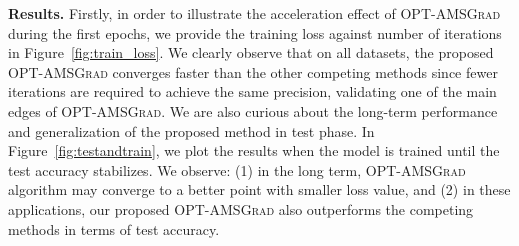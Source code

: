 \documentclass[wcp]{jmlr}
\begin{document}
\textbf{Results.} 
Firstly, in order to illustrate the acceleration effect of \textsc{OPT-AMSGrad} during the first epochs, we provide the training loss against number of iterations in Figure~\ref{fig:train_loss}. 
We clearly observe that on all datasets, the proposed \textsc{OPT-AMSGrad} converges faster than the other competing methods since fewer iterations are required to achieve the same precision, validating one of the main edges of \textsc{OPT-AMSGrad}.
We are also curious about the long-term performance and generalization of the proposed method in test phase.
In Figure~\ref{fig:testandtrain}, we plot the results when the model is trained until the test accuracy stabilizes. 
We observe: \textsf{(1)} in the long term, \textsc{OPT-AMSGrad} algorithm may converge to a better point with smaller loss value, and \textsf{(2)} in these applications, our proposed \textsc{OPT-AMSGrad} also outperforms the competing methods in terms of test accuracy. 
\end{document}
